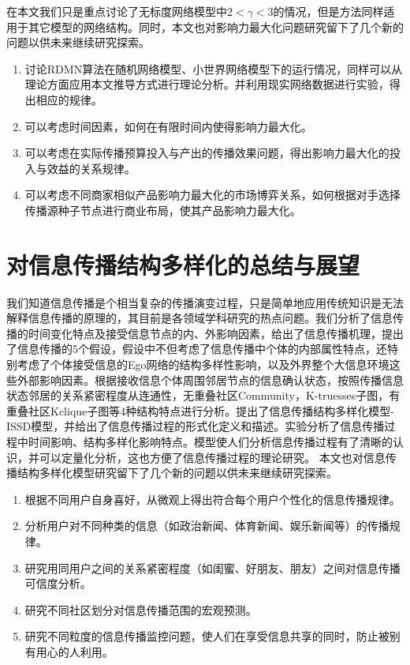 在本文我们只是重点讨论了无标度网络模型中$2<\gamma <3$的情况，但是方法同样适用于其它模型的网络结构。同时，本文也对影响力最大化问题研究留下了几个新的问题以供未来继续研究探索。
\begin{enumerate}[(1)]
	\item 讨论RDMN算法在随机网络模型、小世界网络模型下的运行情况，同样可以从理论方面应用本文推导方式进行理论分析。并利用现实网络数据进行实验，得出相应的规律。
	\item 可以考虑时间因素，如何在有限时间内使得影响力最大化。
	\item 可以考虑在实际传播预算投入与产出的传播效果问题，得出影响力最大化的投入与效益的关系规律。
	\item 可以考虑不同商家相似产品影响力最大化的市场博弈关系，如何根据对手选择传播源种子节点进行商业布局，使其产品影响力最大化。
\end{enumerate}

\section{对信息传播结构多样化的总结与展望}
我们知道信息传播是个相当复杂的传播演变过程，只是简单地应用传统知识是无法解释信息传播的原理的，其目前是各领域学科研究的热点问题。我们分析了信息传播的时间变化特点及接受信息节点的内、外影响因素，给出了信息传播机理，提出了信息传播的5个假设，假设中不但考虑了信息传播中个体的内部属性特点，还特别考虑了个体接受信息的Ego网络的结构多样性影响，以及外界整个大信息环境这些外部影响因素。根据接收信息个体周围邻居节点的信息确认状态，按照传播信息状态邻居的关系紧密程度从连通性，无重叠社区Community，K-truesses子图，有重叠社区Kclique子图等4种结构特点进行分析。提出了信息传播结构多样化模型-ISSD模型，并给出了信息传播过程的形式化定义和描述。实验分析了信息传播过程中时间影响、结构多样化影响特点。模型使人们分析信息传播过程有了清晰的认识，并可以定量化分析，这也方便了信息传播过程的理论研究。
本文也对信息传播结构多样化模型研究留下了几个新的问题以供未来继续研究探索。
\begin{enumerate}[(1)]
	\item 根据不同用户自身喜好，从微观上得出符合每个用户个性化的信息传播规律。
	\item 分析用户对不同种类的信息（如政治新闻、体育新闻、娱乐新闻等）的传播规律。
	\item 研究用同用户之间的关系紧密程度（如闺蜜、好朋友、朋友）之间对信息传播可信度分析。
	\item 研究不同社区划分对信息传播范围的宏观预测。
	\item 研究不同粒度的信息传播监控问题，使人们在享受信息共享的同时，防止被别有用心的人利用。
\end{enumerate}